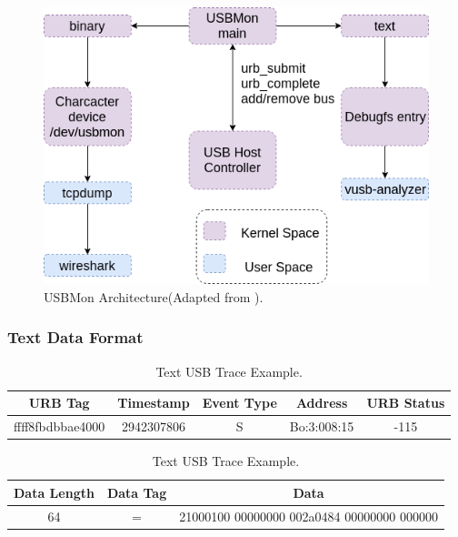 \begin{figure}[h!]
\centering
\includegraphics[width=\textwidth]{Figure/USBMon.png}
\caption{USBMon Architecture(Adapted from \cite{basak_usb_2018}).}
\end{figure}

\subsubsection{Text Data Format}
\begin{table}[h!]
\centering
\begin{tabular}{|c|c|c|c|c|}
\hline
URB Tag & Timestamp & Event Type & Address & URB Status\\
\hline
ffff8fbdbbae4000 & 2942307806 & S & Bo:3:008:15 & -115\\ 
\hline
\end{tabular}
\begin{tabular}{|c|c|c|}
\hline
Data Length & Data Tag & Data\\
\hline
64 & = & 21000100 00000000 002a0484 00000000 000000\\
\hline
\end{tabular}
\caption{Text USB Trace Example.}
\end{table}

